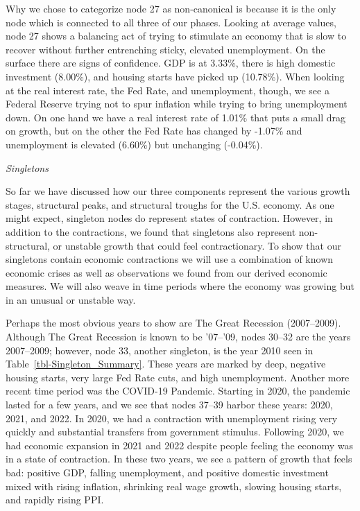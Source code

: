 \documentclass[10pt, letterpaper]{article}
\begin{document}
Why we chose to categorize node 27 as non-canonical is because it is the
only node which is connected to all three of our phases. Looking at
average values, node 27 shows a balancing act of trying to stimulate an
economy that is slow to recover without further entrenching sticky,
elevated unemployment. On the surface there are signs of confidence. GDP
is at 3.33\%, there is high domestic investment (8.00\%), and housing
starts have picked up (10.78\%). When looking at the real interest rate,
the Fed Rate, and unemployment, though, we see a Federal Reserve trying
not to spur inflation while trying to bring unemployment down. On one
hand we have a real interest rate of 1.01\% that puts a small drag on
growth, but on the other the Fed Rate has changed by -1.07\% and
unemployment is elevated (6.60\%) but unchanging (-0.04\%).

\emph{Singletons}

So far we have discussed how our three components represent the various
growth stages, structural peaks, and structural troughs for the U.S.
economy. As one might expect, singleton nodes do represent states of
contraction. However, in addition to the contractions, we found that
singletons also represent non-structural, or unstable growth that could
feel contractionary. To show that our singletons contain economic
contractions we will use a combination of known economic crises as well
as observations we found from our derived economic measures. We will
also weave in time periods where the economy was growing but in an
unusual or unstable way.

Perhaps the most obvious years to show are The Great Recession
(2007--2009). Although The Great Recession is known to be '07--'09,
nodes 30--32 are the years 2007--2009; however, node 33, another
singleton, is the year 2010 seen in Table~\ref{tbl-Singleton_Summary}.
These years are marked by deep, negative housing starts, very large Fed
Rate cuts, and high unemployment. Another more recent time period was
the COVID-19 Pandemic. Starting in 2020, the pandemic lasted for a few
years, and we see that nodes 37--39 harbor these years: 2020, 2021, and
2022. In 2020, we had a contraction with unemployment rising very
quickly and substantial transfers from government stimulus. Following
2020, we had economic expansion in 2021 and 2022 despite people feeling
the economy was in a state of contraction. In these two years, we see a
pattern of growth that feels bad: positive GDP, falling unemployment,
and positive domestic investment mixed with rising inflation, shrinking
real wage growth, slowing housing starts, and rapidly rising PPI.
\end{document}
